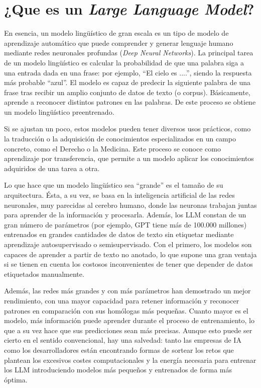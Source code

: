 \section{¿Que es un \textit{Large Language Model}?}

En esencia, un modelo lingüístico de gran escala es un tipo de modelo de aprendizaje automático que puede comprender y generar lenguaje humano mediante redes neuronales profundas (\textit{Deep Neural Networks}). La principal tarea de un modelo lingüístico es calcular la probabilidad de que una palabra siga a una entrada dada en una frase: por ejemplo, ``El cielo es ....'', siendo la respuesta más probable ``azul''. El modelo es capaz de predecir la siguiente palabra de una frase tras recibir un amplio conjunto de datos de texto (o corpus). Básicamente, aprende a reconocer distintos patrones en las palabras. De este proceso se obtiene un modelo lingüístico preentrenado.

Si se ajustan un poco, estos modelos pueden tener diversos usos prácticos, como la traducción o la adquisición de conocimientos especializados en un campo concreto, como el Derecho o la Medicina. Este proceso se conoce como aprendizaje por transferencia, que permite a un modelo aplicar los conocimientos adquiridos de una tarea a otra.

Lo que hace que un modelo lingüístico sea ``grande'' es el tamaño de su arquitectura. Ésta, a su vez, se basa en la inteligencia artificial de las redes neuronales, muy parecidas al cerebro humano, donde las neuronas trabajan juntas para aprender de la información y procesarla. Además, los LLM constan de un gran número de parámetros (por ejemplo, GPT tiene más de 100.000 millones) entrenados en grandes cantidades de datos de texto sin etiquetar mediante aprendizaje autosupervisado o semisupervisado. Con el primero, los modelos son capaces de aprender a partir de texto no anotado, lo que supone una gran ventaja si se tienen en cuenta los costosos inconvenientes de tener que depender de datos etiquetados manualmente.

Además, las redes más grandes y con más parámetros han demostrado un mejor rendimiento, con una mayor capacidad para retener información y reconocer patrones en comparación con sus homólogas más pequeñas. Cuanto mayor es el modelo, más información puede aprender durante el proceso de entrenamiento, lo que a su vez hace que sus predicciones sean más precisas. Aunque esto puede ser cierto en el sentido convencional, hay una salvedad: tanto las empresas de IA como los desarrolladores están encontrando formas de sortear los retos que plantean los excesivos costes computacionales y la energía necesaria para entrenar los LLM introduciendo modelos más pequeños y entrenados de forma más óptima.

